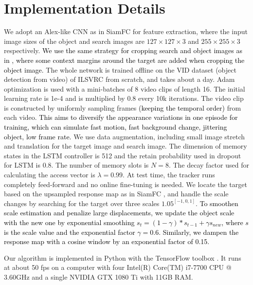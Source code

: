 \documentclass[runningheads]{llncs}
\newcommand{\yty}[1]{\textcolor{black}{#1}}
\newcommand{\ytyy}[1]{\textcolor{black}{#1}}
\newcommand{\abc}[1]{\textcolor{black}{#1}}
\newcommand{\ty}[1]{\textcolor{black}{#1}}
\newcommand{\tyy}[1]{\textcolor{black}{#1}}
\begin{document}
\section{Implementation Details}
We adopt an Alex-like CNN as in SiamFC \cite{Bertinetto2016} for feature extraction, where the input image sizes of the object  and search images are $127\times 127 \times 3$ and $255 \times 255 \times 3$ respectively. \ty{We use the same strategy for cropping search and object images as in \cite{Bertinetto2016}, where some context margins around the target are added when cropping the object image.} The whole network is trained offline on the VID dataset (object detection from video) of ILSVRC \cite{ILSVRC15} from scratch, and takes about a day. %
Adam \cite{kingma2014adam} optimization is used with a mini-batches of 8 video clips of length 16. The initial learning rate is 1e-4 and is multiplied by 0.8 every 10k iterations. The video clip is constructed by %
uniformly sampling frames \abc{(keeping the temporal order)} from each video. \ytyy{This aims to diversify the appearance variations in one episode for training, which can simulate fast motion, fast background change, jittering object, low frame rate.}
We use data augmentation, including small image stretch and translation for the target image and search image. 
The dimension of memory states in the LSTM controller is 512 and the retain probability used in dropout for LSTM is 0.8. The number of memory slots is $N=8$. The decay factor used for calculating the access vector is $\lambda=0.99$.
%
At test time, the tracker runs completely feed-forward and no online fine-tuning is needed. We locate the target based on the upsampled response map as in SiamFC \cite{Bertinetto2016}, and handle the scale changes by searching for the target over three scales $1.05^{[-1,0,1]}$. \tyy{To smoothen scale estimation and penalize large displacements, we update the object scale with the new one by exponential smoothing $s_{t} = (1-\gamma)*s_{t-1}+\gamma s_{new}$, where $s$ is the scale value and the exponential factor $\gamma = 0.6$. Similarly, we dampen the response map with a cosine window by an exponential factor of 0.15.}

Our algorithm is implemented in Python with the TensorFlow toolbox \cite{abadi2016tensorflow}. It runs at about 50 fps on a computer with four Intel(R) Core(TM) i7-7700 CPU @ 3.60GHz and a single NVIDIA GTX 1080 Ti with 11GB RAM.
\end{document}
